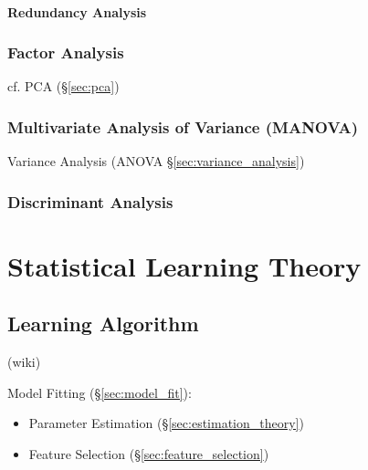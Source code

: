 \paragraph{Redundancy Analysis}\label{sec:redundancy_analysis}\hfill



\subsubsection{Factor Analysis}\label{sec:factor_analysis}

cf. PCA (\S\ref{sec:pca})



\subsubsection{Multivariate Analysis of Variance (MANOVA)}\label{sec:manova}

Variance Analysis (ANOVA \S\ref{sec:variance_analysis})



\subsubsection{Discriminant Analysis}\label{sec:discriminant_analysis}



\section{Statistical Learning Theory}\label{sec:statistical_learning_theory}

\subsection{Learning Algorithm}\label{sec:learning_algorithm}

(wiki)

Model Fitting (\S\ref{sec:model_fit}):
\begin{itemize}
  \item Parameter Estimation (\S\ref{sec:estimation_theory})
  \item Feature Selection (\S\ref{sec:feature_selection})
\end{itemize}


